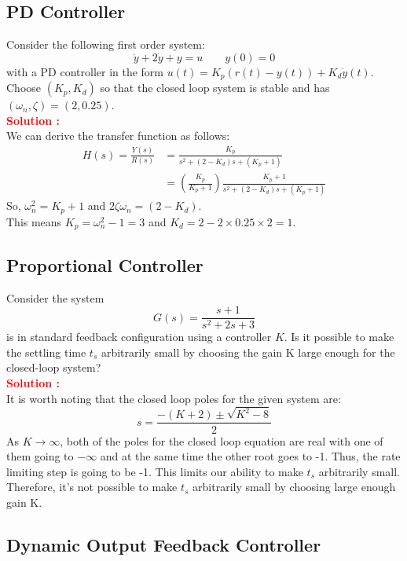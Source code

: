 \documentclass[12pt]{article}
\begin{document}
\subsection{PD Controller}

Consider the following first order system:
\[
\ddot{y} +2\dot{y} +y = u \qquad  y(0) = 0
\]
with a PD controller in the form $u(t) = K_p(r(t) - y(t)) + K_d \dot{y}(t)$.
Choose $(K_p, K_d)$ so that the closed loop system is stable and has $(\omega_n, \zeta) = (2, 0.25)$. \\
\noindent \textbf{\textcolor{red}{Solution :}} \\
We can derive the transfer function as follows:
\begin{equation*}
\begin{split}
H(s) =\frac{Y (s)}{R(s)} &= \frac{K_p}{s^2 + (2 - K_d )s + (K_p + 1)} \\
&= \left( \frac{K_p}{K_p+1}\right)
    \frac{K_p + 1}{s^2 + (2-K_d)s + (K_p + 1)}
\end{split}
\end{equation*}
So, $\omega^2_n = K_p + 1$ and $2\zeta \omega_n = (2-K_d)$. \\
This means $K_p = \omega^2_n - 1 = 3$ and $K_d = 2-2 \times 0.25 \times 2 = 1$.
\clearpage

\subsection{Proportional Controller}
Consider the system 
\[
G(s)=\frac{s + 1}{s^2 + 2s + 3}
\]
is in standard feedback configuration using a controller $K$. Is it possible to make the settling time $t_s$ arbitrarily small by choosing the gain K large enough for the closed-loop system? \\
\textbf{\textcolor{red}{Solution :}} \\
It is worth noting that the closed loop poles for the given system are:
\[
s =\frac{-(K + 2) \pm \sqrt{K^2 - 8}}{2}
\]
As $K \rightarrow \infty$, both of the poles for the closed loop equation are real with one of them going to $-\infty$ and at the same time the other root goes to -1. Thus, the rate limiting step is going to be -1. This limits our ability to make $t_s$ arbitrarily small. Therefore, it's not possible to make $t_s$ arbitrarily small by choosing large enough gain K.
\clearpage

\subsection{ Dynamic Output Feedback Controller}
\end{document}
